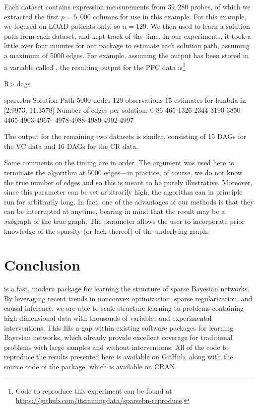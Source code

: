 \documentclass[article]{jss}
\renewcommand{\|}{\,|\,}
\begin{document}
Each dataset contains expression measurements from $39,280$ probes, of which we extracted the first $p=5,000$ columns for use in this example. For this example, we focused on LOAD patients only, so $n=129$. We then used  to learn a solution path from each dataset, and kept track of the time. In our experiments, it took a little over four minutes for our package to estimate each solution path, assuming a maximum of 5000 edges. For example, assuming the output has been stored in a variable called , the resulting output for the PFC data is\footnote{Code to reproduce this experiment can be found at \url{https://github.com/itsrainingdata/sparsebn-reproduce}.}
%
\begin{CodeChunk}
\begin{CodeInput}
R> dags
\end{CodeInput}
\begin{CodeOutput}                          
sparsebn Solution Path
 5000 nodes
 129 observations
 15 estimates for lambda in [2.9973, 11.3578]
 Number of edges per solution: 0-86-465-1326-2344-3190-3850-4465-4903-4967-
 4978-4988-4989-4992-4997
\end{CodeOutput}
\end{CodeChunk}
%
The output for the remaining two datasets is similar, consisting of 15 DAGs for the VC data and 16 DAGs for the CR data.

Some comments on the timing are in order. The  argument was used here to terminate the algorithm at 5000 edges---in practice, of course, we do not know the true number of edges and so this is meant to be purely illustrative. Moreover, since this parameter can be set arbitrarily high, the algorithm can in principle run for arbitrarily long. In fact, one of the advantages of our methods is that they can be interrupted at anytime, bearing in mind that the result may be a \emph{sub}graph of the true graph. The  parameter allows the user to incorporate prior knowledge of the sparsity (or lack thereof) of the underlying graph.

\section{Conclusion}
\label{sec:conc}

 is a fast, modern package for learning the structure of sparse Bayesian networks. By leveraging recent trends in nonconvex optimization, sparse regularization, and causal inference, we are able to scale structure learning to problems containing high-dimensional data with thousands of variables and experimental interventions. This fills a gap within existing software packages for learning Bayesian networks, which already provide excellent coverage for traditional problems with large samples and without interventions. All of the code to reproduce the results presented here is available on GitHub, along with the source code of the  package, which is available on CRAN.
\end{document}
